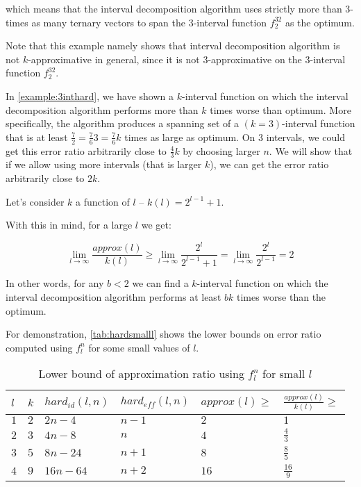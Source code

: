 \begin{example}
which means that the interval decomposition algorithm
uses strictly more
than $3$-times as many ternary vectors to span
the $3$-interval function
$f_2^{32}$ as the optimum.

Note that this example namely shows
that interval decomposition algorithm
is not $k$-approximative in general,
since it is not $3$-approximative
on the $3$-interval function $f_2^{32}$.
\end{example}


In \cref{example:3inthard},
we have shown a $k$-interval function
on which the interval decomposition algorithm performs
more than $k$ times worse than optimum.
More specifically,
the algorithm produces a spanning set
of a $(k=3)$-interval function
that is at least
$\frac{7}{2}
= \frac{7}{6} 3
= \frac{7}{6} k$
times as large as optimum.
On $3$ intervals,
we could get this error ratio arbitrarily close
to $\frac{4}{3} k$
by choosing larger $n$.
We will show that if we allow using more intervals
(that is larger $k$),
we can get the error ratio arbitrarily close to $2k$.

Let's consider $k$ a function of $l$
-- $k(l) = 2^{l-1} + 1$.

With this in mind,
for a large $l$ we get:

$$
\lim_{l \rightarrow \infty}{\frac{approx(l)}{k(l)}}
\geq \lim_{l \rightarrow \infty}{\frac{2^l}{2^{l-1}+1}}
= \lim_{l \rightarrow \infty}{\frac{2^l}{2^{l-1}}}
= 2
$$

In other words,
for any $b < 2$
we can find a $k$-interval function
on which the interval decomposition algorithm
performs at least $bk$ times worse than the optimum.

For demonstration,
\autoref{tab:hardsmalll} shows the lower bounds
on error ratio computed using $f_l^n$
for some small values of $l$.

\begin{table}[h]
\centering
\begin{tabular}{l|lllll}
$l$
& $k$ %
& $\mathit{hard}_{\mathit{id}}(l,n)$ %
& $\mathit{hard}_{\mathit{eff}}(l,n)$ %
& $\mathit{approx}(l) \geq$ %
& $\frac{\mathit{approx}(l)}{k(l)} \geq$
\\
\hline
$1$ & $2$ & $2n-4$ & $n-1$ & $2$ & $1$ \\
$2$ & $3$ & $4n-8$ & $n$ & $4$ & $\frac{4}{3}$ \\
$3$ & $5$ & $8n-24$ & $n+1$ & $8$ & $\frac{8}{5}$ \\
$4$ & $9$ & $16n-64$ & $n+2$ & $16$ & $\frac{16}{9}$
\end{tabular}
\caption{Lower bound of approximation ratio using $f_l^n$
for small $l$}
\label{tab:hardsmalll}
\end{table}

